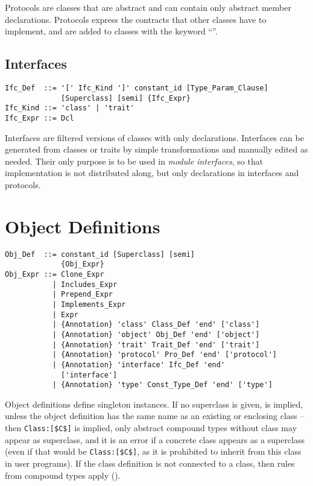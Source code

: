 Protocols are classes that are abstract and can contain only abstract member declarations. Protocols express the contracts that other classes have to implement, and are added to classes with the keyword ``''. 

\subsection{Interfaces}
\label{sec:interfaces}

\syntax\begin{lstlisting}
Ifc_Def  ::= '[' Ifc_Kind ']' constant_id [Type_Param_Clause] 
             [Superclass] [semi] {Ifc_Expr}
Ifc_Kind ::= 'class' | 'trait'
Ifc_Expr ::= Dcl
\end{lstlisting}

Interfaces are filtered versions of classes with only declarations. Interfaces can be generated from classes or traits by simple transformations and manually edited as needed. Their only purpose is to be used in {\em module interfaces}, so that implementation is not distributed along, but only declarations in interfaces and protocols. 


\section{Object Definitions}
\label{sec:object-definitions}

\syntax\begin{lstlisting}
Obj_Def  ::= constant_id [Superclass] [semi]
             {Obj_Expr}
Obj_Expr ::= Clone_Expr
           | Includes_Expr
           | Prepend_Expr
           | Implements_Expr
           | Expr
           | {Annotation} 'class' Class_Def 'end' ['class']
           | {Annotation} 'object' Obj_Def 'end' ['object']
           | {Annotation} 'trait' Trait_Def 'end' ['trait']
           | {Annotation} 'protocol' Pro_Def 'end' ['protocol']
           | {Annotation} 'interface' Ifc_Def 'end' 
             ['interface']
           | {Annotation} 'type' Const_Type_Def 'end' ['type']
\end{lstlisting}

Object definitions define singleton instances. If no superclass is given,  is implied, unless the object definition has the same name as an existing or enclosing class -- then \lstinline!Class:[$C$]! is implied, only abstract compound types without class may appear as superclass, and it is an error if a concrete class appears as a superclass (even if that would be \lstinline!Class:[$C$]!, as it is prohibited to inherit from this class in user programs). If the class definition is not connected to a class, then rules from compound types apply ().

